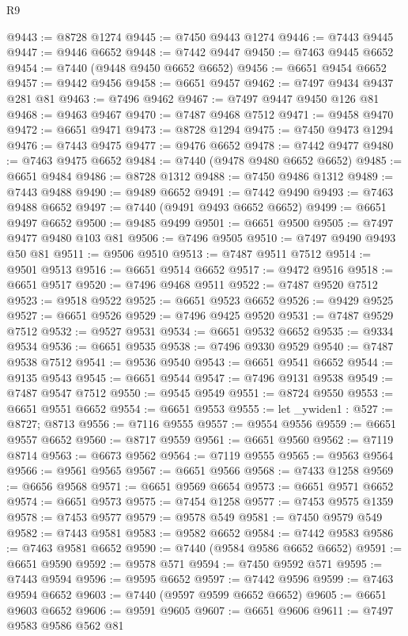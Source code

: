 \begin{lexlean}{R9}
\begin{coremodule}
@9443 := @8728 @1274
@9445 := @7450 @9443 @1274
@9446 := @7443 @9445
@9447 := @9446 @6652
@9448 := @7442 @9447
@9450 := @7463 @9445 @6652
@9454 := @7440 (@9448 @9450 @6652 @6652)
@9456 := @6651 @9454 @6652
@9457 := @9442 @9456
@9458 := @6651 @9457
@9462 := @7497 @9434 @9437 @281 @81
@9463 := @7496 @9462
@9467 := @7497 @9447 @9450 @126 @81
@9468 := @9463 @9467
@9470 := @7487 @9468 @7512
@9471 := @9458 @9470
@9472 := @6651 @9471
@9473 := @8728 @1294
@9475 := @7450 @9473 @1294
@9476 := @7443 @9475
@9477 := @9476 @6652
@9478 := @7442 @9477
@9480 := @7463 @9475 @6652
@9484 := @7440 (@9478 @9480 @6652 @6652)
@9485 := @6651 @9484
@9486 := @8728 @1312
@9488 := @7450 @9486 @1312
@9489 := @7443 @9488
@9490 := @9489 @6652
@9491 := @7442 @9490
@9493 := @7463 @9488 @6652
@9497 := @7440 (@9491 @9493 @6652 @6652)
@9499 := @6651 @9497 @6652
@9500 := @9485 @9499
@9501 := @6651 @9500
@9505 := @7497 @9477 @9480 @103 @81
@9506 := @7496 @9505
@9510 := @7497 @9490 @9493 @50 @81
@9511 := @9506 @9510
@9513 := @7487 @9511 @7512
@9514 := @9501 @9513
@9516 := @6651 @9514 @6652
@9517 := @9472 @9516
@9518 := @6651 @9517
@9520 := @7496 @9468 @9511
@9522 := @7487 @9520 @7512
@9523 := @9518 @9522
@9525 := @6651 @9523 @6652
@9526 := @9429 @9525
@9527 := @6651 @9526
@9529 := @7496 @9425 @9520
@9531 := @7487 @9529 @7512
@9532 := @9527 @9531
@9534 := @6651 @9532 @6652
@9535 := @9334 @9534
@9536 := @6651 @9535
@9538 := @7496 @9330 @9529
@9540 := @7487 @9538 @7512
@9541 := @9536 @9540
@9543 := @6651 @9541 @6652
@9544 := @9135 @9543
@9545 := @6651 @9544
@9547 := @7496 @9131 @9538
@9549 := @7487 @9547 @7512
@9550 := @9545 @9549
@9551 := @8724 @9550
@9553 := @6651 @9551 @6652
@9554 := @6651 @9553
@9555 := let _ywiden1 : @527 := @8727; @8713
@9556 := @7116 @9555
@9557 := @9554 @9556
@9559 := @6651 @9557 @6652
@9560 := @8717 @9559
@9561 := @6651 @9560
@9562 := @7119 @8714
@9563 := @6673 @9562
@9564 := @7119 @9555
@9565 := @9563 @9564
@9566 := @9561 @9565
@9567 := @6651 @9566
@9568 := @7433 @1258
@9569 := @6656 @9568
@9571 := @6651 @9569 @6654
@9573 := @6651 @9571 @6652
@9574 := @6651 @9573
@9575 := @7454 @1258
@9577 := @7453 @9575 @1359
@9578 := @7453 @9577
@9579 := @9578 @549
@9581 := @7450 @9579 @549
@9582 := @7443 @9581
@9583 := @9582 @6652
@9584 := @7442 @9583
@9586 := @7463 @9581 @6652
@9590 := @7440 (@9584 @9586 @6652 @6652)
@9591 := @6651 @9590
@9592 := @9578 @571
@9594 := @7450 @9592 @571
@9595 := @7443 @9594
@9596 := @9595 @6652
@9597 := @7442 @9596
@9599 := @7463 @9594 @6652
@9603 := @7440 (@9597 @9599 @6652 @6652)
@9605 := @6651 @9603 @6652
@9606 := @9591 @9605
@9607 := @6651 @9606
@9611 := @7497 @9583 @9586 @562 @81

\end{coremodule}
\end{lexlean}
